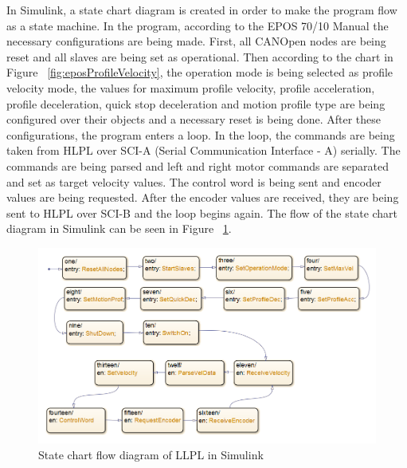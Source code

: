 	In Simulink, a state chart diagram is created in order to make the program flow as a state machine. In the program, according to the EPOS 70/10 Manual the necessary configurations are being made. First, all CANOpen nodes are being reset and all slaves are being set as operational. Then according to the chart in Figure ~\ref{fig:eposProfileVelocity}, the operation mode is being selected as profile velocity mode, the values for maximum profile velocity, profile acceleration, profile deceleration, quick stop deceleration and motion profile type are being configured over their objects and a necessary reset is being done. After these configurations, the program enters a loop. In the loop, the commands are being taken from HLPL over SCI-A (Serial Communication Interface - A) serially. The commands are being parsed and left and right motor commands are separated and set as target velocity values. The control word is being sent and encoder values are being requested. After the encoder values are received, they are being sent to HLPL over SCI-B and the loop begins again. The flow of the state chart diagram in Simulink can be seen in Figure ~\ref{fig:simulinkStateFlow}.
	\begin{figure}
		\centering
		\includegraphics[scale=0.5]{images/simulinkStateFlow}
		\caption{State chart flow diagram of LLPL in Simulink}
		\label{fig:simulinkStateFlow}
	\end{figure}
	

